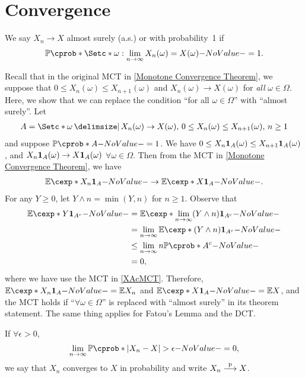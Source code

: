 \documentclass[12pt]{article}
\begin{document}


\section{Convergence}

\begin{Definition}
We say $X_n \to X$ almost surely (a.s.) or with probability~1 if 
\begin{align*}
\P (\set*{\omega: \lim_{n \to \infty} {X_n(\omega)=X(\omega)}})=1.
\end{align*}
\end{Definition}

Recall that in the original MCT in \cref{Monotone Convergence Theorem}, we suppose that $0 \leq X_n(\omega) \leq X_{n+1}(\omega)$ and $X_n(\omega) \to X(\omega)$ for \emph{all} $\omega\in\Omega$. Here, we show that we can replace the condition ``for all $\omega\in\Omega$'' with ``almost surely''. Let 
\begin{align*}
A=\set*{\omega \given X_n(\omega) \to X(\omega),\, 0\leq X_n(\omega )\leq X_{n+1}(\omega ),\, n \geq 1}
\end{align*}
and suppose $\P (A)=1$. We have $0\leq X_n {\bf 1}_{A}(\omega)\leq X_{n+1} {\bf 1}_{A}(\omega)$, and $X_{n} {\bf 1}_{A}(\omega) \to X {\bf 1}_{A}(\omega)$ $\forall \omega \in \Omega$. Then from the MCT in \cref{Monotone Convergence Theorem}, we have
\begin{align*}
\E[X_n \indicatore{A}] \to \E[X \indicatore{A}].
\end{align*}
For any $Y \geq 0$, let $Y \wedge n = \min(Y,n)$ for $n\geq 1$. Observe that
\begin{align}
\E[Y\indicatore{A^c}] 
&= \E[\lim_{n \to \infty} (Y \wedge n) \indicatore{A^c}]\nn
&= \lim_{n \to \infty} \E[(Y \wedge n)\indicatore{A^c}]\label{XAcMCT}\\
& \leq \lim_{n \to \infty} {n \P (A^c)}\nn
&= 0,\nonumber
\end{align}
where we have use the MCT in \cref{XAcMCT}. Therefore, $\E[X_n \indicatore{A}] = \E X_n$ and $\E[X \indicatore{A}] = \E X$, and the MCT holds if ``$\forall \omega\in\Omega$'' is replaced with ``almost surely'' in its theorem statement. The same thing applies for Fatou's Lemma and the DCT.

\begin{Definition}
If $\forall \epsilon >0$,  
\begin{align*}
\lim_ {n \to \infty} \P({|X_n - X| > \epsilon})=0, 
\end{align*}
we say that $X_n$ converges to $X$ in probability and write $X_n \stackrel{\mathrm{p}}{\longrightarrow} X$.
\end{Definition}
\end{document}
